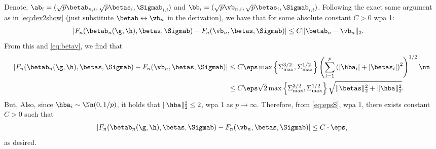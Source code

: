 Denote, $\ab_i=(\sqrt{p}\betab_{n,i},\sqrt{p}\betas_i,\Sigmab_{i,i})$ and $\bb_i=(\sqrt{p}\vb_{n,i},\sqrt{p}\betas_i,\Sigmab_{i,i})$. Following the exact same argument as in \eqref{eq:dev2show} (just substitute $\betab\leftrightarrow\vb_n$ in the derivation), we have that for some absolute constant $C>0$ wpa 1:
\begin{align}
|F_n(\betab_n(\g,\h),\betas,\Sigmab) - F_n(\vb_n,\betas,\Sigmab)| &\leq C \|\betab_n-\vb_n\|_2.
\end{align}
From this and \eqref{eq:betav}, we find that
\begin{align}
|F_n(\betab_n(\g,\h),\betas,\Sigmab) - F_n(\vb_n,\betas,\Sigmab)|
&\leq  
C\eps\max\left\{\Sigma_{\max}^{3/2},\Sigma_{\max}^{1/2} \right\} \left(\sum_{i=1}^p \left(|\hba_i|+|\betas_i|\right)^2\right)^{1/2}\nn
\\
 &\leq 
C\eps\sqrt{2}\max\left\{\Sigma_{\max}^{3/2},\Sigma_{\max}^{1/2}\right\}\sqrt{\|\betas\|_2^2 + \|\hba\|_2^2}.\label{eq:epsS}
\end{align}
But, 
Also, since $\hba_i\sim\Nn(0,1/p)$, it holds that $\|\hba\|_2^2\leq 2$, wpa 1 as $p\rightarrow\infty$. Therefore, from \eqref{eq:epsS}, wpa 1, there exists constant $C>0$ such that 
\begin{align}
|F_n(\betab_n(\g,\h),\betas,\Sigmab) - F_n(\vb_n,\betas,\Sigmab)| \leq C \cdot\eps,
\end{align}
as desired.


